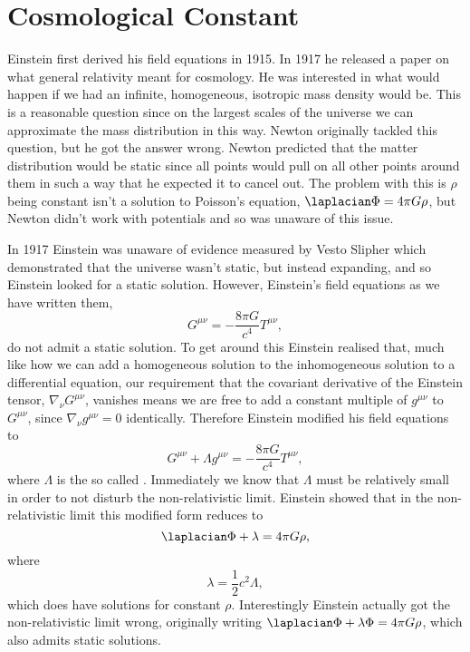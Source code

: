 \documentclass[fleqn]{NotesClass}
\newcommand*{\covariantDerivative}[1]{\nabla_{\!#1}}
\begin{document}
    \section{Cosmological Constant}
    Einstein first derived his field equations in 1915.
    In 1917 he released a paper on what general relativity meant for cosmology.
    He was interested in what would happen if we had an infinite, homogeneous, isotropic mass density would be.
    This is a reasonable question since on the largest scales of the universe we can approximate the mass distribution in this way.
    Newton originally tackled this question, but he got the answer wrong.
    Newton predicted that the matter distribution would be static since all points would pull on all other points around them in such a way that he expected it to cancel out.
    The problem with this is \(\rho\) being constant isn't a solution to Poisson's equation, \(\laplacian \Phi = 4\pi G\rho\), but Newton didn't work with potentials and so was unaware of this issue.
    
    In 1917 Einstein was unaware of evidence measured by Vesto Slipher which demonstrated that the universe wasn't static, but instead expanding, and so Einstein looked for a static solution.
    However, Einstein's field equations as we have written them,
    \begin{equation}
        G^{\mu\nu} = -\frac{8\pi G}{c^4}T^{\mu\nu},
    \end{equation}
    do not admit a static solution.
    To get around this Einstein realised that, much like how we can add a homogeneous solution to the inhomogeneous solution to a differential equation, our requirement that the covariant derivative of the Einstein tensor, \(\covariantDerivative{\nu}G^{\mu\nu}\), vanishes means we are free to add a constant multiple of \(g^{\mu\nu}\) to \(G^{\mu\nu}\), since \(\covariantDerivative{\nu}g^{\mu\nu} = 0\) identically.
    Therefore Einstein modified his field equations to
    \begin{equation}
        G^{\mu\nu} + \Lambda g^{\mu\nu} = -\frac{8\pi G}{c^4}T^{\mu\nu},
    \end{equation}
    where \(\Lambda\) is the so called .
    Immediately we know that \(\Lambda\) must be relatively small in order to not disturb the non-relativistic limit.
    Einstein showed that in the non-relativistic limit this modified form reduces to
    \begin{equation}
        \laplacian\Phi + \lambda = 4\pi G\rho,
    \end{equation}
    where
    \begin{equation}
        \lambda = \frac{1}{2}c^2\Lambda,
    \end{equation}
    which does have solutions for constant \(\rho\).
    Interestingly Einstein actually got the non-relativistic limit wrong, originally writing \(\laplacian\Phi + \lambda \Phi = 4\pi G\rho\), which also admits static solutions.
    
\end{document}
